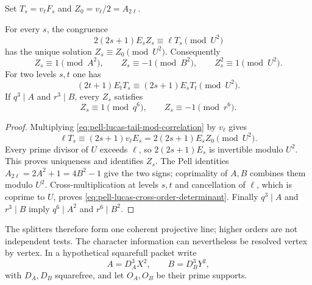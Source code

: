 Set $T_s=v_\ell F_s$ and $Z_0=v_\ell/2=A_{2\ell}$.

\begin{theorem}
\label{thm:pell-lucas-every-order-splitters}
For every $s$, the congruence
\begin{equation}\label{eq:pell-lucas-every-order-reconstruction}
 2(2s+1)E_s Z_s\equiv\ell T_s\pmod{U^2}
\end{equation}
has the unique solution
$Z_s\equiv Z_0\pmod{U^2}$.  Consequently
\begin{equation}\label{eq:pell-lucas-every-order-signs}
 Z_s\equiv1\pmod{A^2},\qquad
 Z_s\equiv-1\pmod{B^2},\qquad Z_s^2\equiv1\pmod{U^2}.
\end{equation}
For two levels $s,t$ one has
\begin{equation}\label{eq:pell-lucas-cross-order-determinant}
 (2t+1)E_tT_s\equiv(2s+1)E_sT_t\pmod{U^2}.
\end{equation}
If $q^3\mid A$ and $r^3\mid B$, every $Z_s$ satisfies
\begin{equation}\label{eq:pell-lucas-opposite-depth-six}
                 Z_s\equiv1\pmod{q^6},\qquad
                 Z_s\equiv-1\pmod{r^6}.
\end{equation}
\end{theorem}

\begin{proof}
Multiplying \eqref{eq:pell-lucas-tail-mod-correlation} by $v_\ell$ gives
\[
 \ell T_s\equiv(2s+1)v_\ell E_s
              =2(2s+1)E_sZ_0\pmod{U^2}.
\]
Every prime divisor of $U$ exceeds $\ell$, so
$2(2s+1)E_s$ is invertible modulo $U^2$.  This proves uniqueness and
identifies $Z_s$.  The Pell identities
$A_{2\ell}=2A^2+1=4B^2-1$ give the two signs; coprimality of $A,B$ combines
them modulo $U^2$.  Cross-multiplication at levels $s,t$ and cancellation of
$\ell$, which is coprime to $U$, proves
\eqref{eq:pell-lucas-cross-order-determinant}.  Finally $q^3\mid A$ and
$r^3\mid B$ imply $q^6\mid A^2$ and $r^6\mid B^2$.
\end{proof}

The splitters therefore form one coherent projective line; higher orders are
not independent tests.  The character information can nevertheless be
resolved vertex by vertex.  In a hypothetical squarefull packet write
\[
 A=D_A^3X^2,\qquad B=D_B^3Y^2,
\]
with $D_A,D_B$ squarefree, and let $O_A,O_B$ be their prime supports.

